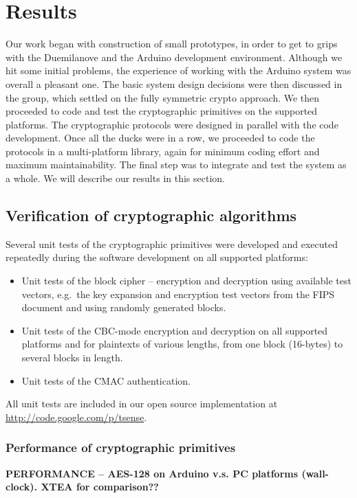 
\chapter{Results}
\label{sec:results}

Our work began with construction of small prototypes, in order to get to grips with the Duemilanove and the Arduino development environment. Although we hit some initial problems, the experience of working with the Arduino system was overall a pleasant one. The basic system design decisions were then discussed in the group, which settled on the fully symmetric crypto approach. We then proceeded to code and test the cryptographic primitives on the supported platforms. The cryptographic protocols were designed in parallel with the code development. Once all the ducks were in a row, we proceeded to code the protocols in a multi-platform library, again for minimum coding effort and maximum maintainability. The final step was to integrate and test the system as a whole. We will describe our results in this section.

\section{Verification of cryptographic algorithms}

Several unit tests of the cryptographic primitives were developed and executed repeatedly during the software development on all supported platforms:
\begin{itemize}
\item Unit tests of the block cipher -- encryption and decryption using available test vectors, e.g.\ the key expansion and encryption test vectors from the FIPS document and using randomly generated blocks.
\item Unit tests of the CBC-mode encryption and decryption on all supported platforms and for plaintexts of various lengths, from one block (16-bytes) to several blocks in length.
\item Unit tests of the CMAC authentication. 
\end{itemize}
All unit tests are included in our open source implementation at \url{http://code.google.com/p/tsense}.

\subsection{Performance of cryptographic primitives}

\textbf{PERFORMANCE -- AES-128 on Arduino v.s. PC platforms (wall-clock). XTEA for comparison??}

